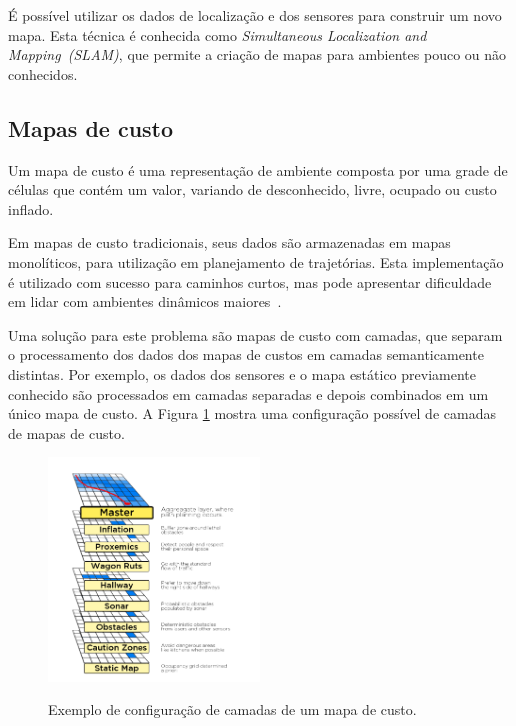 \documentclass[repeatfields,xlists,xpacks,oneside,yearsonly]{ufrgscca}
\begin{document}
É possível utilizar os dados de localização e dos sensores para construir um novo mapa.
Esta técnica é conhecida como \textit{Simultaneous Localization and Mapping~(SLAM)},
que permite a criação de mapas para ambientes pouco ou não conhecidos.

\subsection{Mapas de custo}

Um mapa de custo é uma representação de ambiente composta por uma
grade de células que contém um valor, variando de desconhecido, livre,
ocupado ou custo inflado.

Em mapas de custo tradicionais, seus dados são armazenadas em mapas monolíticos,
para utilização em planejamento de trajetórias.
Esta implementação é utilizado com sucesso para caminhos curtos,
mas pode apresentar dificuldade em lidar com ambientes dinâmicos
maiores~\cite{layered_costmaps}.

Uma solução para este problema são mapas de custo com camadas,
que separam o processamento dos dados dos mapas de custos em camadas semanticamente distintas.
Por exemplo, os dados dos sensores e o mapa estático previamente conhecido são processados
em camadas separadas e depois combinados em um único mapa de custo.
A Figura \ref{fig:mapa_camadas} mostra uma configuração possível de camadas
de mapas de custo.

\begin{figure}[htbp]
    {
        \centering
        \caption{Exemplo de configuração de camadas de um mapa de custo.}
        \label{fig:mapa_camadas}
        \includegraphics[width=0.5\textwidth]{mapa_camadas.png}\\
    }
    {}
\end{figure}
\end{document}
